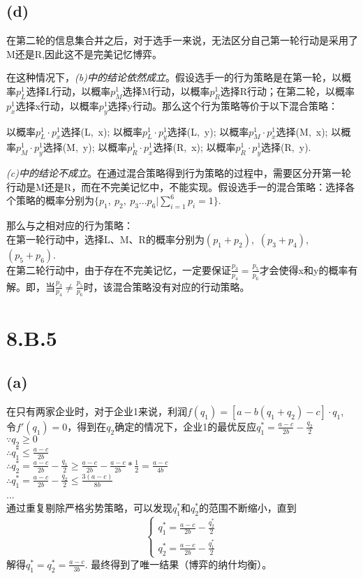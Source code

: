 \documentclass[10pt,fleqn]{article}
\begin{document}
\subsection*{(d)}
在第二轮的信息集合并之后，对于选手一来说，无法区分自己第一轮行动是采用了M还是R,因此这不是完美记忆博弈。

在这种情况下，\emph{(b)中的结论依然成立}。假设选手一的行为策略是在第一轮，以概率$p^1_L$选择L行动，以概率$p^1_M$选择M行动，以概率$p^1_R$选择R行动；在第二轮，以概率$p_x^1$选择x行动，以概率$p_y^1$选择y行动。那么这个行为策略等价于以下混合策略：

以概率$p^1_L \cdot p^1_x$选择(L,~x);
以概率$p^1_L \cdot p^1_y$选择(L,~y);
以概率$p^1_M \cdot p^1_x$选择(M,~x);
以概率$p^1_M \cdot p^1_y$选择(M,~y);
以概率$p^1_R \cdot p^1_x$选择(R,~x);
以概率$p^1_R \cdot p^1_y$选择(R,~y).

\emph{(c)中的结论不成立}。在通过混合策略得到行为策略的过程中，需要区分开第一轮行动是M还是R，而在不完美记忆中，不能实现。假设选手一的混合策略：选择各个策略的概率分别为$\{p_1,~p_2,~p_3...p_{6} \vert \sum_{i=1}^{6} p_i=1 \}$. 

那么与之相对应的行为策略：\\
在第一轮行动中，选择L、M、R的概率分别为$(p_1+p_2)$,~$(p_3+p_4)$,~$(p_5+p_6)$.\\
在第二轮行动中，由于存在不完美记忆，一定要保证$\frac{p_3}{p_4}=\frac{p_5}{p_6}$才会使得x和y的概率有解。即，当$\frac{p_3}{p_4}\neq \frac{p_5}{p_6}$时，该混合策略没有对应的行动策略。

\section*{8.B.5}
\subsection*{(a)}
在只有两家企业时，对于企业1来说，利润$f(q_1)=[a-b(q_1+q_2)-c]\cdot q_1 $,\\
令$f'(q_1)=0 $，得到在$q_2$确定的情况下，企业1的最优反应$q_1^{*}=\frac{a-c}{2b}-\frac{q_2}{2} $\\
$\because q_2 \geq 0 $ \\
$\therefore q_1^* \leq \frac{a-c}{2b} $ \\
$\therefore q_2^* = \frac{a-c}{2b}-\frac{q_1}{2} \geq
\frac{a-c}{2b}-\frac{a-c}{2b}\ast \frac{1}{2} =
\frac{a-c}{4b} $ \\
$\therefore q_1^* =\frac{a-c}{2b}-\frac{q_2}{2} \leq \frac{3(a-c)}{8b} $ \\
...\\
通过重复剔除严格劣势策略，可以发现$q_1^*$和$q_2^*$的范围不断缩小，直到
\begin{displaymath}
\left\{
	\begin{array}{l}
		q_1^* =\frac{a-c}{2b}-\frac{q_2^*}{2} \\
		q_2^* =\frac{a-c}{2b}-\frac{q_1^*}{2}
	\end{array}
\right.
\end{displaymath}
解得$q_1^*= q_2^*=\frac{a-c}{3b}$. 最终得到了唯一结果（博弈的纳什均衡）。
\end{document}
